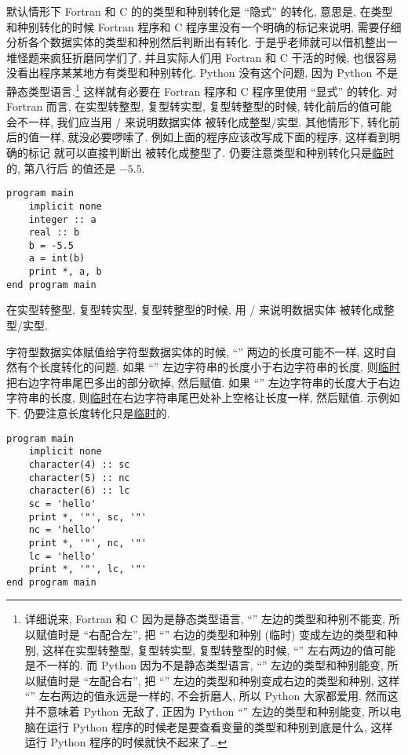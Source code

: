 默认情形下 Fortran 和 C 的的类型和种别转化是 ``隐式'' 的转化, 意思是, 在类型和种别转化的时候 Fortran 程序和 C 程序里没有一个明确的标记来说明, 需要仔细分析各个数据实体的类型和种别然后判断出有转化. 于是乎老师就可以借机整出一堆怪题来疯狂折磨同学们了, 并且实际人们用 Fortran 和 C 干活的时候, 也很容易没看出程序某某地方有类型和种别转化. Python 没有这个问题, 因为 Python 不是静态类型语言.\footnote{详细说来, Fortran 和 C 因为是静态类型语言, ``\ttt{=}'' 左边的类型和种别不能变, 所以赋值时是 ``右配合左'', 把 ``\ttt{=}'' 右边的类型和种别 (临时) 变成左边的类型和种别, 这样在实型转整型, 复型转实型, 复型转整型的时候, ``\ttt{=}'' 左右两边的值可能是不一样的. 而 Python 因为不是静态类型语言, ``\ttt{=}'' 左边的类型和种别能变, 所以赋值时是 ``左配合右'', 把 ``\ttt{=}'' 左边的类型和种别变成右边的类型和种别, 这样 ``\ttt{=}'' 左右两边的值永远是一样的, 不会折磨人, 所以 Python 大家都爱用. 然而这并不意味着 Python 无敌了, 正因为 Python ``\ttt{=}'' 左边的类型和种别能变, 所以电脑在运行 Python 程序的时候老是要查看变量的类型和种别到底是什么, 这样运行 Python 程序的时候就快不起来了\dots{}} 这样就有必要在 Fortran 程序和 C 程序里使用 ``显式'' 的转化. 对 Fortran 而言, 在实型转整型, 复型转实型, 复型转整型的时候, 转化前后的值可能会不一样, 我们应当用 / 来说明数据实体 \ttt{[entity]} 被转化成整型/实型. 其他情形下, 转化前后的值一样, 就没必要啰嗦了. 例如上面的程序应该改写成下面的程序, 这样看到明确的标记  就可以直接判断出  被转化成整型了. 仍要注意类型和种别转化只是\uline{临时}的, 第八行后  的值还是 $-5.5$.
\begin{lstlisting}
program main
    implicit none
    integer :: a
    real :: b
    b = -5.5
    a = int(b)
    print *, a, b
end program main
\end{lstlisting}
\begin{convention}
    在实型转整型, 复型转实型, 复型转整型的时候, 用  / 来说明数据实体 \ttt{\emph{[entity]}} 被转化成整型/实型.
\end{convention}

字符型数据实体赋值给字符型数据实体的时候, ``\ttt{=}'' 两边的长度可能不一样, 这时自然有个长度转化的问题. 如果 ``\ttt{=}'' 左边字符串的长度小于右边字符串的长度, 则\uline{临时}把右边字符串尾巴多出的部分砍掉, 然后赋值. 如果 ``\ttt{=}'' 左边字符串的长度大于右边字符串的长度, 则\uline{临时}在右边字符串尾巴处补上空格让长度一样, 然后赋值. 示例如下. 仍要注意长度转化只是\uline{临时}的.
\begin{lstlisting}
program main
    implicit none
    character(4) :: sc
    character(5) :: nc
    character(6) :: lc
    sc = 'hello'
    print *, '"', sc, '"'
    nc = 'hello'
    print *, '"', nc, '"'
    lc = 'hello'
    print *, '"', lc, '"'
end program main
\end{lstlisting}

